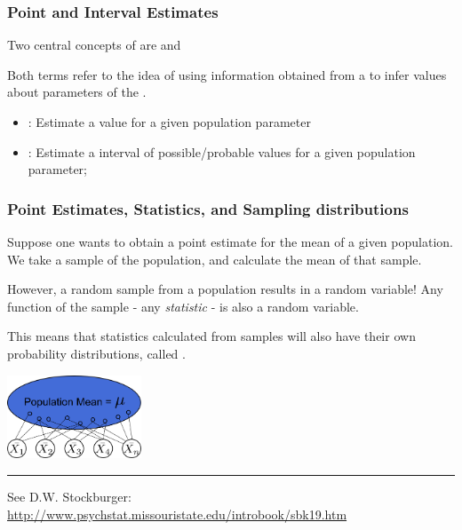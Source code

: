 \documentclass[10pt]{beamer}
\begin{document}
\begin{frame}
  \frametitle{Point and Interval Estimates} 

  Two central concepts of  are
   and 

  \medskip

  Both terms refer to the idea of using information obtained from a
   to infer values about parameters of the
  .

  \vfill

  \begin{itemize}
    \item {}: Estimate a value for a given population parameter
    \item {}: Estimate a interval of
      possible/probable values for a given population parameter;
  \end{itemize}
\end{frame}

\begin{frame}
  \frametitle{Point Estimates, Statistics, and Sampling distributions}
  
  Suppose one wants to obtain a point estimate for the mean of a given
  population. We take a sample of the population, and calculate the
  mean of that sample.

  \medskip

  However, a random sample from a population results in a random
  variable! Any function of the sample - any \emph{statistic} - is
  also a random variable.

  \medskip

  This means that statistics calculated from samples will also have
  their own probability distributions, called .
  
  \begin{center}
    \includegraphics[width=0.3\textwidth]{img/meanestimator}
  \end{center}
  
  \rule{\textwidth}{0.4pt}
  {\tiny See D.W. Stockburger: \url{http://www.psychstat.missouristate.edu/introbook/sbk19.htm}}
\end{frame}
\end{document}
